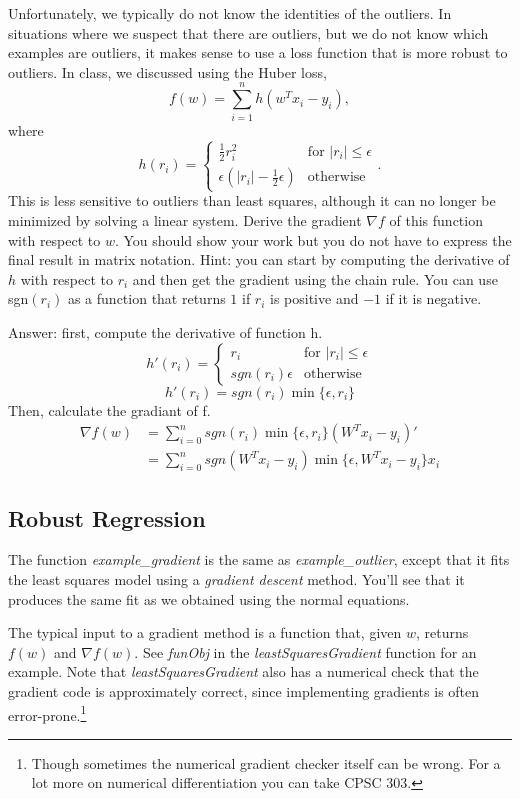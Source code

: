 \documentclass{article}
\def\ans#1{\par\gre{Answer: #1}}
\def\blu#1{{\color{blu}#1}}
\def\gre#1{{\color{gre}#1}}
\def\half{\frac 1 2}
\begin{document}
Unfortunately, we typically do not know the identities of the outliers. In situations where we suspect that there are outliers, but we do not know which examples are outliers, it makes sense to use a loss function that is more robust to outliers. In class, we discussed using the Huber loss,
\[
f(w) = \sum_{i=1}^n h(w^Tx_i  -y_i),
\]
where
\[
h(r_i) = 
\begin{cases}
\half r_i^2 & \text{for $|r_i| \leq \epsilon$}\\
\epsilon(|r_i| - \half \epsilon) & \text{otherwise}
\end{cases}.
\]
This is less sensitive to outliers than least squares, although it can no longer be minimized by solving a linear system.
 \blu{Derive
 the gradient $\nabla f$ of this function with respect to $w$. You should show your work but you do not have to express the final result in matrix notation.}
 Hint: you can start by computing the derivative of $h$ with respect to $r_i$ and then get the gradient using the chain rule. You can use sgn$(r_i)$ as a function that returns $1$ if $r_i$ is positive and $-1$ if it is negative.
\ans{
    first, compute the derivative of function h.
    \[h'(r_i) = \begin{cases} r_i & \text{for $|r_i| \leq \epsilon$}\\
        sgn(r_i)\epsilon & \text{otherwise}
    \end{cases} \]
    \[h'(r_i) = sgn(r_i) \min\{\epsilon, r_i\}\]
    Then, calculate the gradiant of f.
    \begin {align*}
    \nabla f(w) &= \sum_{i=0}^n sgn(r_i) \min\{\epsilon, r_i\}  (W^Tx_i-y_i)' \\
    &= \sum_{i=0}^n sgn(W^Tx_i-y_i) \min\{\epsilon, W^Tx_i-y_i\}  x_i
    \end{align*}
}

\subsection{Robust Regression}

The function \emph{example\_gradient} is the same as \emph{example\_outlier}, except that it fits the least squares model using a \emph{gradient descent} method. You'll see that it produces the same fit as we obtained using the normal equations.

The typical input to a gradient method is a function that, given $w$, returns $f(w)$ and $\nabla f(w)$. See \emph{funObj} in the \emph{leastSquaresGradient} function for an example. Note that \emph{leastSquaresGradient} also has a numerical check that the gradient code is approximately correct, since implementing gradients is often error-prone.\footnote{Though sometimes the numerical gradient checker itself can be wrong. For a lot more on numerical differentiation you can take CPSC 303.}
\end{document}

